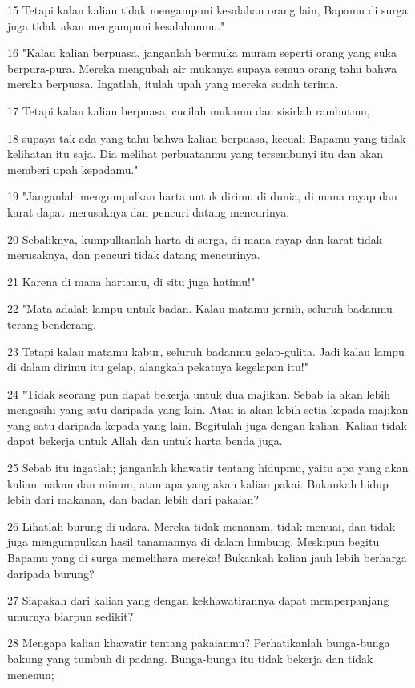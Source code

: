 \par 15 Tetapi kalau kalian tidak mengampuni kesalahan orang lain, Bapamu di surga juga tidak akan mengampuni kesalahanmu."
\par 16 "Kalau kalian berpuasa, janganlah bermuka muram seperti orang yang suka berpura-pura. Mereka mengubah air mukanya supaya semua orang tahu bahwa mereka berpuasa. Ingatlah, itulah upah yang mereka sudah terima.
\par 17 Tetapi kalau kalian berpuasa, cucilah mukamu dan sisirlah rambutmu,
\par 18 supaya tak ada yang tahu bahwa kalian berpuasa, kecuali Bapamu yang tidak kelihatan itu saja. Dia melihat perbuatanmu yang tersembunyi itu dan akan memberi upah kepadamu."
\par 19 "Janganlah mengumpulkan harta untuk dirimu di dunia, di mana rayap dan karat dapat merusaknya dan pencuri datang mencurinya.
\par 20 Sebaliknya, kumpulkanlah harta di surga, di mana rayap dan karat tidak merusaknya, dan pencuri tidak datang mencurinya.
\par 21 Karena di mana hartamu, di situ juga hatimu!"
\par 22 "Mata adalah lampu untuk badan. Kalau matamu jernih, seluruh badanmu terang-benderang.
\par 23 Tetapi kalau matamu kabur, seluruh badanmu gelap-gulita. Jadi kalau lampu di dalam dirimu itu gelap, alangkah pekatnya kegelapan itu!"
\par 24 "Tidak seorang pun dapat bekerja untuk dua majikan. Sebab ia akan lebih mengasihi yang satu daripada yang lain. Atau ia akan lebih setia kepada majikan yang satu daripada kepada yang lain. Begitulah juga dengan kalian. Kalian tidak dapat bekerja untuk Allah dan untuk harta benda juga.
\par 25 Sebab itu ingatlah; janganlah khawatir tentang hidupmu, yaitu apa yang akan kalian makan dan minum, atau apa yang akan kalian pakai. Bukankah hidup lebih dari makanan, dan badan lebih dari pakaian?
\par 26 Lihatlah burung di udara. Mereka tidak menanam, tidak menuai, dan tidak juga mengumpulkan hasil tanamannya di dalam lumbung. Meskipun begitu Bapamu yang di surga memelihara mereka! Bukankah kalian jauh lebih berharga daripada burung?
\par 27 Siapakah dari kalian yang dengan kekhawatirannya dapat memperpanjang umurnya biarpun sedikit?
\par 28 Mengapa kalian khawatir tentang pakaianmu? Perhatikanlah bunga-bunga bakung yang tumbuh di padang. Bunga-bunga itu tidak bekerja dan tidak menenun;
